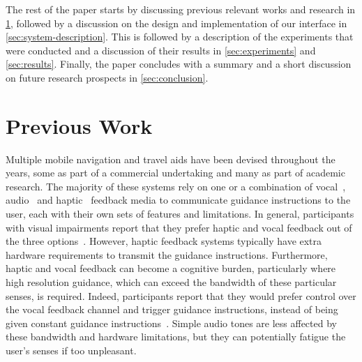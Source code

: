 \documentclass{article}
\begin{document}
The rest of the paper starts by discussing previous relevant works and research in \cref{sec:prev-work}, followed by a discussion on the design and implementation of our interface in \cref{sec:system-description}.
This is followed by a description of the experiments that were conducted and a discussion of their results in \cref{sec:experiments} and \cref{sec:results}.
Finally, the paper concludes with a summary and a short discussion on future research prospects in \cref{sec:conclusion}.

\section{Previous Work}\label{sec:prev-work}

Multiple mobile navigation and travel aids have been devised throughout the years, some as part of a commercial undertaking and many as part of academic research.
The majority of these systems rely on one or a combination of vocal~\cite{mocanu2016when,chessa2016integrated,kanwal2015navigation}, audio~\cite{schwarze2015intuitive,rodriguez2012obstacle,katz2010navig} and haptic~\cite{rivera-rubio2015assistive,lee2015rgb,xiao2015assistive} feedback media to communicate guidance instructions to the user, each with their own sets of features and limitations.
In general, participants with visual impairments report that they prefer haptic and vocal feedback out of the three options~\cite{arditi2013user}.
However, haptic feedback systems typically have extra hardware requirements to transmit the guidance instructions.
Furthermore, haptic and vocal feedback can become a cognitive burden, particularly where high resolution guidance, which can exceed the bandwidth of these particular senses, is required.
Indeed, participants report that they would prefer control over the vocal feedback channel and trigger guidance instructions, instead of being given constant guidance instructions~\cite{arditi2013user}.
Simple audio tones are less affected by these bandwidth and hardware limitations, but they can potentially fatigue the user's senses if too unpleasant.
\end{document}
